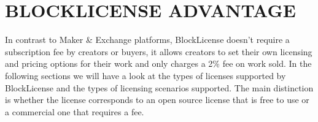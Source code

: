 \clearpage
\section{BLOCKLICENSE ADVANTAGE}

In contrast to Maker \& Exchange platforms, BlockLicense doesn't require a subscription fee by creators or buyers, it allows creators to set their own licensing and pricing options for their work and only charges a 2\%  fee on work sold. In the following sections we will have a look at the types of licenses supported by BlockLicense and the types of licensing scenarios supported. The main distinction is whether the license corresponds to an open source license that is free to use or a commercial one that requires a fee.

